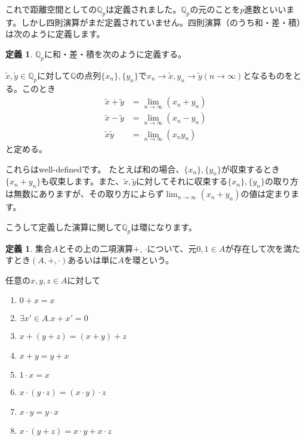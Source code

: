 \documentclass[uplatex]{jsarticle}
\newcommand{\Q}{\mathbb{Q}}
\theoremstyle{definition} %
\newtheorem{defi}[thm]{定義}
\begin{document}
これで距離空間としての$\Q_p$は定義されました。$\Q_p$の元のことを$p$進数といいます。しかし四則演算がまだ定義されていません。四則演算（のうち和・差・積）は次のように定義します。

\begin{oframed}\begin{defi}
$\Q_p$に和・差・積を次のように定義する。

$\tilde{x}, \tilde{y} \in \Q_p$に対して$\Q$の点列$\{x_n\}, \{y_n\}$で$x_n \to \tilde{x}, y_n \to \tilde{y} (n \to \infty)$となるものをとる。このとき
\begin{align*}
\tilde{x} + \tilde{y} &= \lim_{n\to\infty} (x_n + y_n) \\
\tilde{x} - \tilde{y} &= \lim_{n\to\infty} (x_n - y_n) \\
\tilde{x} \tilde{y} &= \lim_{n\to\infty} (x_n y_n)
\end{align*}
と定める。
\end{defi}\end{oframed}

これらはwell-definedです。
たとえば和の場合、$\{x_n\}, \{y_n\}$が収束するとき$\{x_n + y_n\}$も収束します。また、$\tilde{x}, \tilde{y}$に対してそれに収束する$\{x_n\}, \{y_n\}$の取り方は無数にありますが、その取り方によらず$\lim_{n\to\infty} (x_n + y_n)$の値は定まります。

こうして定義した演算に関して$\Q_p$は環になります。

\begin{oframed}\begin{defi}
集合$A$とその上の二項演算$+$, $\cdot$について、元$0, 1 \in A$が存在して次を満たすとき$(A, +, \cdot)$あるいは単に$A$を環という。

任意の$x, y, z \in A$に対して
\begin{enumerate}
\item $0 + x = x$
\item $\exists x'\in A. x + x' = 0$
\item $x + (y + z) = (x + y) + z$
\item $x + y = y + x$
\item $1 \cdot x = x$
\item $x \cdot (y \cdot z) = (x \cdot y) \cdot z$
\item $x \cdot y = y \cdot x$
\item $x \cdot (y + z) = x \cdot y + x \cdot z$
\end{enumerate}
\end{defi}\end{oframed}
\end{document}
